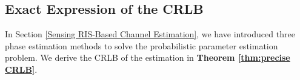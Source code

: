 \documentclass[journal,twocolumn]{IEEEtran}
\theoremstyle{nonumberplain}
\begin{document}
%
%
    
\subsection{Exact Expression of the CRLB} \label{Precise CRLB}
In Section \ref{Sensing RIS-Based Channel Estimation}, we have introduced three phase estimation methods to solve the probabilistic parameter estimation problem.
We derive the CRLB \cite{casella2021statistical} of the estimation in \textbf{Theorem \ref{thm:precise CRLB}}.
    
\end{document}
